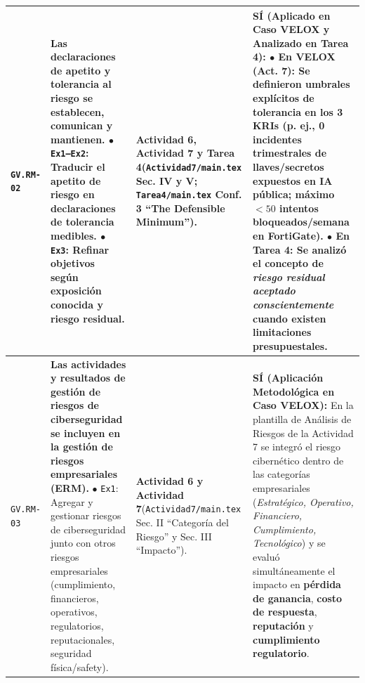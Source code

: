 \documentclass[letterpaper,11pt]{article}
\begin{document}
\begin{longtable}{|C{1.5cm}|L{5.3cm}|L{4.3cm}|L{5.8cm}|}
\texttt{GV.RM-02} &
\textbf{Las declaraciones de apetito y tolerancia al riesgo se establecen, comunican y mantienen.}\newline
$\bullet$ \texttt{Ex1--Ex2}: Traducir el apetito de riesgo en declaraciones de tolerancia medibles.\newline
$\bullet$ \texttt{Ex3}: Refinar objetivos según exposición conocida y riesgo residual. &
\textbf{Actividad 6, Actividad 7 y Tarea 4}\newline (\texttt{Actividad7/main.tex} Sec. IV y V; \texttt{Tarea4/main.tex} Conf. 3 ``The Defensible Minimum''). &
\textbf{SÍ (Aplicado en Caso VELOX y Analizado en Tarea 4):}\newline
$\bullet$ \textbf{En VELOX (Act. 7):} Se definieron umbrales explícitos de tolerancia en los 3 KRIs (p. ej., 0 incidentes trimestrales de llaves/secretos expuestos en IA pública; máximo $<50$ intentos bloqueados/semana en FortiGate).\newline
$\bullet$ \textbf{En Tarea 4:} Se analizó el concepto de \textit{riesgo residual aceptado conscientemente} cuando existen limitaciones presupuestales. \\
\hline

\texttt{GV.RM-03} &
\textbf{Las actividades y resultados de gestión de riesgos de ciberseguridad se incluyen en la gestión de riesgos empresariales (ERM).}\newline
$\bullet$ \texttt{Ex1}: Agregar y gestionar riesgos de ciberseguridad junto con otros riesgos empresariales (cumplimiento, financieros, operativos, regulatorios, reputacionales, seguridad física/safety). &
\textbf{Actividad 6 y Actividad 7}\newline (\texttt{Actividad7/main.tex} Sec. II ``Categoría del Riesgo'' y Sec. III ``Impacto''). &
\textbf{SÍ (Aplicación Metodológica en Caso VELOX):}\newline
En la plantilla de Análisis de Riesgos de la Actividad 7 se integró el riesgo cibernético dentro de las categorías empresariales (\textit{Estratégico, Operativo, Financiero, Cumplimiento, Tecnológico}) y se evaluó simultáneamente el impacto en \textbf{pérdida de ganancia}, \textbf{costo de respuesta}, \textbf{reputación} y \textbf{cumplimiento regulatorio}. \\
\hline


\end{longtable}
\end{document}
